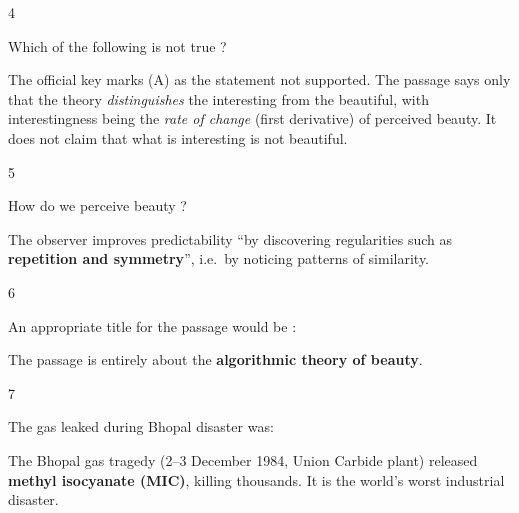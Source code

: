 \begin{question}{4}
{Which of the following is not true ?\par}
\begin{explain}
The official key marks (A) as the statement not supported. The passage says only that the theory \emph{distinguishes} the interesting from the beautiful, with interestingness being the \emph{rate of change} (first derivative) of perceived beauty. It does not claim that what is interesting is not beautiful.
\end{explain}
\end{question}

\begin{question}{5}
{How do we perceive beauty ?\par}
\begin{explain}
The observer improves predictability ``by discovering regularities such as \textbf{repetition and symmetry}'', i.e.\ by noticing patterns of similarity.
\end{explain}
\end{question}

\begin{question}{6}
{An appropriate title for the passage would be :\par}
\begin{explain}
The passage is entirely about the \textbf{algorithmic theory of beauty}.
\end{explain}
\end{question}

\begin{question}{7}
{The gas leaked during Bhopal disaster was:\par}
\begin{explain}
The Bhopal gas tragedy (2--3 December 1984, Union Carbide plant) released \textbf{methyl isocyanate (MIC)}, killing thousands. It is the world's worst industrial disaster.
\end{explain}
\end{question}

